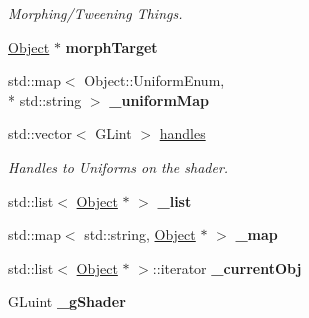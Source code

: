 \begin{DoxyCompactItemize}
\begin{DoxyCompactList}\small\item\em Morphing/\-Tweening Things. \end{DoxyCompactList}\item 
\hypertarget{class_object_acfc4dec49d5d273910c3a1af2b3adfcd}{\hyperlink{class_object}{Object} $\ast$ {\bfseries morph\-Target}}\label{class_object_acfc4dec49d5d273910c3a1af2b3adfcd}

\item 
\hypertarget{class_object_a6378d0b0eeec23045ae2a5245e42bf13}{std\-::map$<$ Object\-::\-Uniform\-Enum, \\*
std\-::string $>$ {\bfseries \-\_\-uniform\-Map}}\label{class_object_a6378d0b0eeec23045ae2a5245e42bf13}

\item 
std\-::vector$<$ G\-Lint $>$ \hyperlink{class_object_acd6c7021617ea334915a1525f9519bc5}{handles}
\begin{DoxyCompactList}\small\item\em Handles to Uniforms on the shader. \end{DoxyCompactList}\item 
\hypertarget{class_scene_acdd0123ca6b2d64d8d447bb485b235fc}{std\-::list$<$ \hyperlink{class_object}{Object} $\ast$ $>$ {\bfseries \-\_\-list}}\label{class_scene_acdd0123ca6b2d64d8d447bb485b235fc}

\item 
\hypertarget{class_scene_a8bd5d86484a12255b26b92b6cbf8d29a}{std\-::map$<$ std\-::string, \hyperlink{class_object}{Object} $\ast$ $>$ {\bfseries \-\_\-map}}\label{class_scene_a8bd5d86484a12255b26b92b6cbf8d29a}

\item 
\hypertarget{class_scene_ae87ca5350fcc595f3f15a4fd3c39f3d9}{std\-::list$<$ \hyperlink{class_object}{Object} $\ast$ $>$\-::iterator {\bfseries \-\_\-current\-Obj}}\label{class_scene_ae87ca5350fcc595f3f15a4fd3c39f3d9}

\item 
\hypertarget{class_scene_a8f9bdd8ec5edb1f414fbd314a36e2724}{G\-Luint {\bfseries \-\_\-g\-Shader}}\label{class_scene_a8f9bdd8ec5edb1f414fbd314a36e2724}

\end{DoxyCompactItemize}
